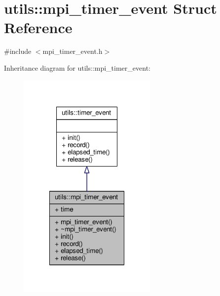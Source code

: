 \hypertarget{structutils_1_1mpi__timer__event}{\section{utils\-:\-:mpi\-\_\-timer\-\_\-event Struct Reference}
\label{structutils_1_1mpi__timer__event}
}


{\ttfamily \#include $<$mpi\-\_\-timer\-\_\-event.\-h$>$}



Inheritance diagram for utils\-:\-:mpi\-\_\-timer\-\_\-event\-:
\nopagebreak
\begin{figure}[H]
\begin{center}
\leavevmode
\includegraphics[width=192pt]{structutils_1_1mpi__timer__event__inherit__graph}
\end{center}
\end{figure}


